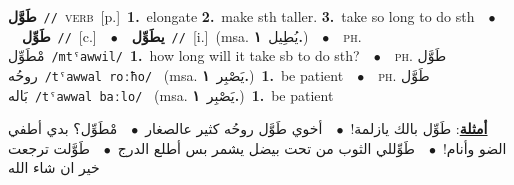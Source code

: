 \documentclass[10pt,a4paper,twoside]{article} %
\begin{document}
\begin{multicols}{2}
{\setlength\topsep{0pt}\textbf{\foreignlanguage{arabic}{طَوَّل}}\ {\color{gray}\texttt{//}\color{black}}\ \textsc{verb}\ [p.]\ \textbf{1.}~elongate  \textbf{2.}~make sth taller.  \textbf{3.}~take so long to do sth\ \ $\bullet$\ \ \setlength\topsep{0pt}\textbf{\foreignlanguage{arabic}{طَوِّل}}\ {\color{gray}\texttt{//}\color{black}}\ [c.]\ \ $\bullet$\ \ \setlength\topsep{0pt}\textbf{\foreignlanguage{arabic}{يطَوِّل}}\ {\color{gray}\texttt{//}\color{black}}\ [i.]\ \color{gray}(msa. \foreignlanguage{arabic}{يُطِيل}~\foreignlanguage{arabic}{\textbf{١.}})\color{black}\ \ $\bullet$\ \ \textsc{ph.} \color{gray} \foreignlanguage{arabic}{مْطَوِّل}\color{black}\ {\color{gray}\texttt{/{\sffamily mtˤawwil}/}\color{black}}\ \textbf{1.}~how long will it take sb to do sth?\ \ $\bullet$\ \ \textsc{ph.} \color{gray} \foreignlanguage{arabic}{طَوَّل روحُه}\color{black}\ {\color{gray}\texttt{/{\sffamily tˤawwal roːħo}/}\color{black}}\ \color{gray} (msa. \foreignlanguage{arabic}{يَصْبِر}~\foreignlanguage{arabic}{\textbf{١.}})\color{black}\ \textbf{1.}~be patient\ \ $\bullet$\ \ \textsc{ph.} \color{gray} \foreignlanguage{arabic}{طَوَّل بَاله}\color{black}\ {\color{gray}\texttt{/{\sffamily tˤawwal baːlo}/}\color{black}}\ \color{gray} (msa. \foreignlanguage{arabic}{يَصْبِر}~\foreignlanguage{arabic}{\textbf{١.}})\color{black}\ \textbf{1.}~be patient\  \begin{flushright}\color{gray}\foreignlanguage{arabic}{\textbf{\underline{\foreignlanguage{arabic}{أمثلة}}}: طَوِّل بالك يازلمة!\ $\bullet$\ \  أخوي طَوَّل روحُه كثير عالصغار\ $\bullet$\ \  مْطَوِّل؟ بدي أطفي الضو وأنام!\ $\bullet$\ \  طَوِّللي الثوب من تحت بيضل يشمر بس أطلع الدرج\ $\bullet$\ \  طَوَّلت ترجعت خير ان شاء الله}\end{flushright}\color{black}} \vspace{2mm}


\end{multicols}
\end{document}
